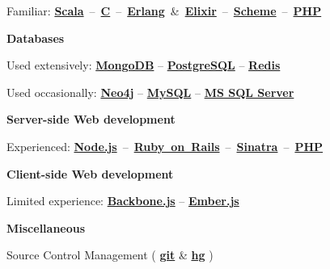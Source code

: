 \documentclass{tccv}
\begin{document}
{{\hspace{2pt}%
Familiar:
\mbox{\href{http://www.scala-lang.org}{\bf Scala} -- %
     \href{https://en.wikipedia.org/wiki/C_(programming_language)}{\bf C} -- %
     \href{http://www.erlang.org}{\bf Erlang} \& %
     \href{http://elixir-lang.org}{\bf Elixir} --  %
     \href{http://schemers.org}{\bf Scheme} -- %
     \href{http://php.net}{\bf PHP}%
}



\vspace{9pt}%
\hspace{-1pt}%
\textsf{\textbf{Databases}}
	 
\hspace{2pt}%
Used extensively: %
     \href{http://www.mongodb.org}{\bf MongoDB} -- %
     \href{http://www.postgresql.org}{\bf PostgreSQL} -- %
     \href{http://redis.io}{\bf Redis}%

\hspace{2pt}%
Used occasionally: %
     \href{http://www.neo4j.org}{\bf Neo4j} -- %
     \href{http://www.mysql.com}{\bf MySQL} -- %
     \href{http://www.microsoft.com/en-us/sqlserver/default.aspx}{\bf MS SQL Server}%



\vspace{9pt}%
\hspace{-1pt}%
\textsf{\textbf{Server-side Web development}}
 
\hspace{2pt}%
Experienced: %
\mbox{\href{http://nodejs.org}{\bf Node.js} -- %
     \href{http://rubyonrails.org}{\bf Ruby on Rails} -- %
     \href{http://www.sinatrarb.com}{\bf Sinatra} -- %
     \href{http://php.net}{\bf PHP}%
}



\vspace{9pt}%
\hspace{-1pt}%
\textsf{\textbf{Client-side Web development}}
	 
\hspace{2pt}%
Limited experience: %
     \href{http://backbonejs.org}{\bf Backbone.js} -- %
     \href{http://emberjs.com}{\bf Ember.js}%



\vspace{9pt}%
\hspace{-1pt}%
\textsf{\textbf{Miscellaneous}}

\hspace{2pt}%
Source Control Management (%
	\href{http://git-scm.com}{\bf git} \& %
	\href{http://www.selenic.com/mercurial/}{\bf hg}%
)%

}}
\end{document}
